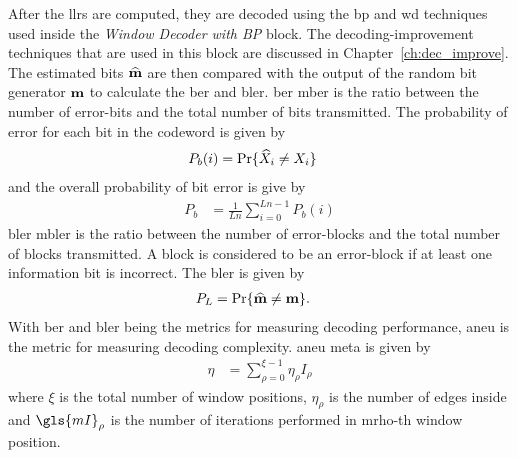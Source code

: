 After the \glspl{llr} are computed, they are decoded using the \gls{bp} and \gls{wd} techniques used inside the \emph{Window Decoder with BP} block. The decoding-improvement techniques that are used in this block are discussed in Chapter~\ref{ch:dec_improve}. The estimated bits $\widehat{\mathbf{m}}$ are then compared with the output of the random bit generator $\mathbf{m}$ to calculate the \gls{ber} and \gls{bler}. \gls{ber} \gls{mber} is the ratio between the number of error-bits and the total number of bits transmitted. The probability of error for each bit in the codeword is given by
\begin{align}
P_b(i)&=\text{Pr}\{\widehat{X}_i\neq X_i\}
\end{align}
and the overall probability of bit error is give by
\begin{align}
P_b&=\frac{1}{Ln}\sum_{i=0}^{Ln-1}P_b(i)\label{eq:indiv_prob}
\end{align}
\gls{bler} \gls{mbler} is the ratio between the number of error-blocks and the total number of blocks transmitted. A block is considered to be an error-block if at least one information bit is incorrect. The \gls{bler} is given by
\begin{align}
P_L&=\text{Pr}\{\widehat{\mathbf{m}}\neq \mathbf{m}\}.
\end{align}
With \gls{ber} and \gls{bler} being the metrics for measuring decoding performance, \gls{aneu} is the metric for measuring decoding complexity. \gls{aneu} \gls{meta} is given by
\begin{align}
\eta&=\sum_{\rho=0}^{\xi-1}\eta_\rho I_\rho
\end{align}
where $\xi$ is the total number of window positions, $\eta_\rho$ is the number of edges inside and $\gls{mI}_\rho$ is the number of iterations performed in \gls{mrho}-th window position.